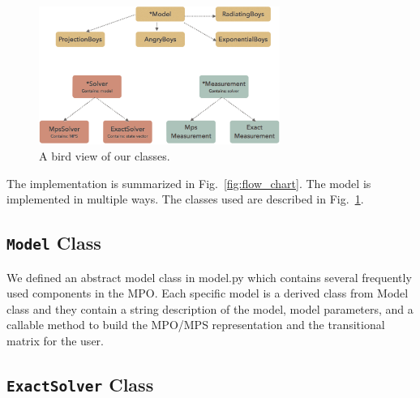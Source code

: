 \documentclass[english]{article}
\begin{document}
\begin{figure}[htbp]
\begin{center}
\includegraphics[width=0.7\textwidth]{class_diagram_new.pdf}
\caption{A bird view of our classes.}
\label{fig:class_diagram}
\end{center}
\end{figure}


The implementation is summarized in Fig.~\ref{fig:flow_chart}. The model is implemented in multiple ways. The classes used are described in Fig.~\ref{fig:class_diagram}.
\subsection{\texttt{Model} Class}
We defined an abstract model class in model.py which contains several frequently used components in the MPO. Each specific model is a derived class from Model class and they contain a string description of the model, model parameters, and a callable method to build the MPO/MPS representation and the transitional matrix for the user.
\subsection{\texttt{ExactSolver} Class}
\end{document}
